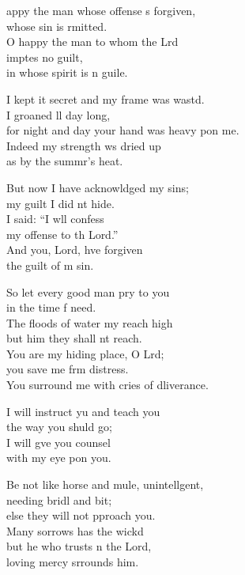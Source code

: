 \settowidth{\versewidth}{for night and day your hand was heavy upon me.}
\begin{psalmverse}%
  \begin{patverse}
appy the man whose offense \pointup{\i}s forgiven,\Med\\
whose sin is rmitted.\\
O happy the man to whom the Lrd\Flex\\
imptes no guilt,\Med\\
in whose spirit is n guile.

I kept it secret and my frame was wastd.\Flex\\
I groaned ll day long,\Med\\
for night and day your hand was heavy pon me.\\
Indeed my strength ws dried up\Med\\
as by the summr’s heat.

But now I have acknowldged my sins;\Med\\
my guilt I did nt hide.\\
I said: “I w\pointup{\i}ll confess\Med\\
my offense to th Lord.”\\
And you, Lord, hve forgiven\Med\\
the guilt of m sin.

So let every good man pry to you\Med\\
in the time f need.\\
The floods of water my reach high\Med\\
but him they shall nt reach.\\
You are my hiding place, O Lrd;\Flex\\
you save me frm distress.\Med\\
You surround me with cries of dliverance.

I will instruct yu and teach you\Med\\
the way you shuld go;\\
I will g\pointup{\i}ve you counsel\Med\\
with my eye pon you.

Be not like horse and mule, unintell\pointup{\i}gent,\Flex\\
needing bridl and bit;\Med\\
else they will not pproach you.\Med\\
Many sorrows has the wickd\\
but he who trusts \pointup{\i}n the Lord,\Med\\
loving mercy srrounds him.


\end{patverse}
\end{psalmverse}
